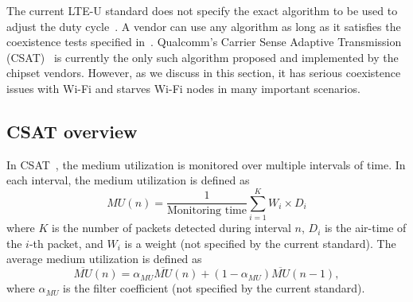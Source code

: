 
The current LTE-U standard does not specify the exact algorithm to be used to adjust the duty cycle~\cite{lteuforum_lteu}. 
A vendor can use any algorithm as long as it satisfies the coexistence tests specified in~\cite{lteuforum_lteu}. 
Qualcomm's Carrier Sense Adaptive Transmission (CSAT)~\cite{lteuforum_csat} is currently the only such algorithm proposed and implemented by the chipset vendors.
However, as we discuss in this section, it has serious coexistence issues with Wi-Fi and starves Wi-Fi nodes in many important scenarios. 















\subsection{CSAT overview}
\label{sec:csatdef}

In CSAT~\cite{lteuforum_csat}, the medium utilization is monitored over multiple intervals of time. 
In each interval, the medium utilization is defined as 
\begin{equation}
  MU(n) = \frac{1}{\mbox{Monitoring time}} \sum_{i=1}^K W_i \times D_i  \label{eq:mu}
\end{equation}
where $K$ is the number of packets detected during interval $n$, $D_i$ is the air-time of the $i$-th packet, and $W_i$ is a weight (not specified by the current standard). 
The average medium utilization is defined as 
\begin{equation}
  \overline{MU}(n) = \alpha_{MU} \overline{MU}(n) + (1-\alpha_{MU})\overline{MU}(n-1),  \label{eq:mua}
\end{equation}
where $\alpha_{MU}$ is the filter coefficient (not specified by the current standard).

